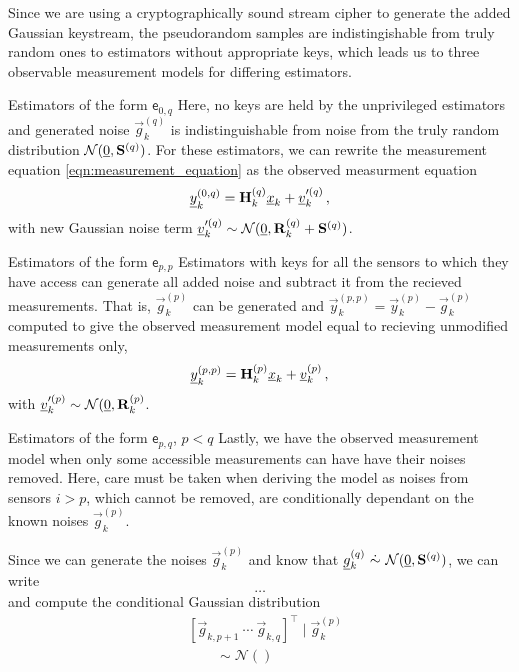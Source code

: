 \documentclass[conference]{IEEEtran}
\begin{document}
Since we are using a cryptographically sound stream cipher to generate the added Gaussian keystream, the pseudorandom samples are indistingishable from truly random ones to estimators without appropriate keys, which leads us to three observable measurement models for differing estimators.
\begin{LaTeXdescription}
  \item[Estimators of the form $\mathsf{e}_{0,q}$] Here, no keys are held by the unprivileged estimators and generated noise $\vec{g}_k^{(q)}$ is indistinguishable from noise from the truly random distribution $\mathcal{N}({\underline{0}}, {{\mathbf{S}}}^{(q)})$. For these estimators, we can rewrite the measurement equation \eqref{eqn:measurement_equation} as the observed measurment equation
  \begin{equation}
    {\underline{y}}_k^{(0,q)} = {{\mathbf{H}}}_k^{(q)}{\underline{x}}_k + {\underline{v}}_k^{\prime(q)}\,,
  \end{equation}
  with new Gaussian noise term ${\underline{v}}_k^{\prime(q)} \sim \mathcal{N}({\underline{0}}, {{\mathbf{R}}}_k^{(q)}+{{\mathbf{S}}}^{(q)})$.
  
  \item[Estimators of the form $\mathsf{e}_{p,p}$] Estimators with keys for all the sensors to which they have access can generate all added noise and subtract it from the recieved measurements. That is, $\vec{g}_k^{(p)}$ can be generated and $\vec{y}_k^{(p,p)}=\vec{y}_k^{(p)}-\vec{g}_k^{(p)}$ computed to give the observed measurement model equal to recieving unmodified measurements only,
  \begin{equation}
    {\underline{y}}_k^{(p,p)} = {{\mathbf{H}}}_k^{(p)}{\underline{x}}_k + {\underline{v}}_k^{(p)}\,,
  \end{equation}
  with ${\underline{v}}_k^{\prime(p)} \sim \mathcal{N}({\underline{0}}, {{\mathbf{R}}}_k^{(p)}$.

  \item[Estimators of the form $\mathsf{e}_{p,q}$, $p<q$] Lastly, we have the observed measurement model when only some accessible measurements can have have their noises removed. Here, care must be taken when deriving the model as noises from sensors $i>p$, which cannot be removed, are conditionally dependant on the known noises $\vec{g}_k^{(p)}$. 
  
  Since we can generate the noises $\vec{g}_k^{(p)}$ and know that $\vec{g}_k^{(q)}\ \dot{\sim}\ \mathcal{N}(\vec{0}, \mat{S}^{(q)})$, we can write 
  \begin{equation}
    \dots
  \end{equation}
  and compute the conditional Gaussian distribution
  \begin{equation}
    \begin{split}
      &\left[\vec{g}_{k,p+1}\ \cdots\ \vec{g}_{k,q}\right]^\top \mid \vec{g}_k^{(p)}\\
      &\qquad \sim \mathcal{N}()
    \end{split}
  \end{equation}


\end{LaTeXdescription}
\end{document}
